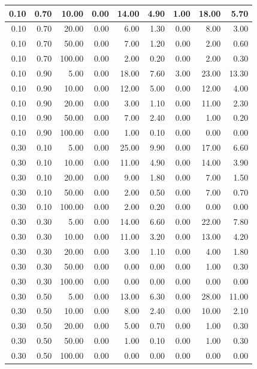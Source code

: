 \documentclass{bmstu}
\begin{document}
\begin{longtable}{|r|r|r|r|r|r|r|r|r|}
0.10 & 0.70 & 10.00 & 0.00 & 14.00 & 4.90 & 1.00 & 18.00 & 5.70 \\ \hline
0.10 & 0.70 & 20.00 & 0.00 & 6.00 & 1.30 & 0.00 & 8.00 & 3.00 \\ \hline
0.10 & 0.70 & 50.00 & 0.00 & 7.00 & 1.20 & 0.00 & 2.00 & 0.60 \\ \hline
0.10 & 0.70 & 100.00 & 0.00 & 2.00 & 0.20 & 0.00 & 2.00 & 0.30 \\ \hline
0.10 & 0.90 & 5.00 & 0.00 & 18.00 & 7.60 & 3.00 & 23.00 & 13.30 \\ \hline
0.10 & 0.90 & 10.00 & 0.00 & 12.00 & 5.00 & 0.00 & 12.00 & 4.00 \\ \hline
0.10 & 0.90 & 20.00 & 0.00 & 3.00 & 1.10 & 0.00 & 11.00 & 2.30 \\ \hline
0.10 & 0.90 & 50.00 & 0.00 & 7.00 & 2.40 & 0.00 & 1.00 & 0.20 \\ \hline
0.10 & 0.90 & 100.00 & 0.00 & 1.00 & 0.10 & 0.00 & 0.00 & 0.00 \\ \hline
0.30 & 0.10 & 5.00 & 0.00 & 25.00 & 9.90 & 0.00 & 17.00 & 6.60 \\ \hline
0.30 & 0.10 & 10.00 & 0.00 & 11.00 & 4.90 & 0.00 & 14.00 & 3.90 \\ \hline
0.30 & 0.10 & 20.00 & 0.00 & 9.00 & 1.80 & 0.00 & 7.00 & 1.50 \\ \hline
0.30 & 0.10 & 50.00 & 0.00 & 2.00 & 0.50 & 0.00 & 7.00 & 0.70 \\ \hline
0.30 & 0.10 & 100.00 & 0.00 & 2.00 & 0.20 & 0.00 & 0.00 & 0.00 \\ \hline
0.30 & 0.30 & 5.00 & 0.00 & 14.00 & 6.60 & 0.00 & 22.00 & 7.80 \\ \hline
0.30 & 0.30 & 10.00 & 0.00 & 11.00 & 3.20 & 0.00 & 13.00 & 4.20 \\ \hline
0.30 & 0.30 & 20.00 & 0.00 & 3.00 & 1.10 & 0.00 & 4.00 & 1.80 \\ \hline
0.30 & 0.30 & 50.00 & 0.00 & 0.00 & 0.00 & 0.00 & 1.00 & 0.30 \\ \hline
0.30 & 0.30 & 100.00 & 0.00 & 0.00 & 0.00 & 0.00 & 0.00 & 0.00 \\ \hline
0.30 & 0.50 & 5.00 & 0.00 & 13.00 & 6.30 & 0.00 & 28.00 & 11.00 \\ \hline
0.30 & 0.50 & 10.00 & 0.00 & 8.00 & 2.40 & 0.00 & 10.00 & 2.10 \\ \hline
0.30 & 0.50 & 20.00 & 0.00 & 5.00 & 0.70 & 0.00 & 1.00 & 0.30 \\ \hline
0.30 & 0.50 & 50.00 & 0.00 & 1.00 & 0.10 & 0.00 & 1.00 & 0.30 \\ \hline
0.30 & 0.50 & 100.00 & 0.00 & 0.00 & 0.00 & 0.00 & 0.00 & 0.00 \\ \hline

\end{longtable}
\end{document}
